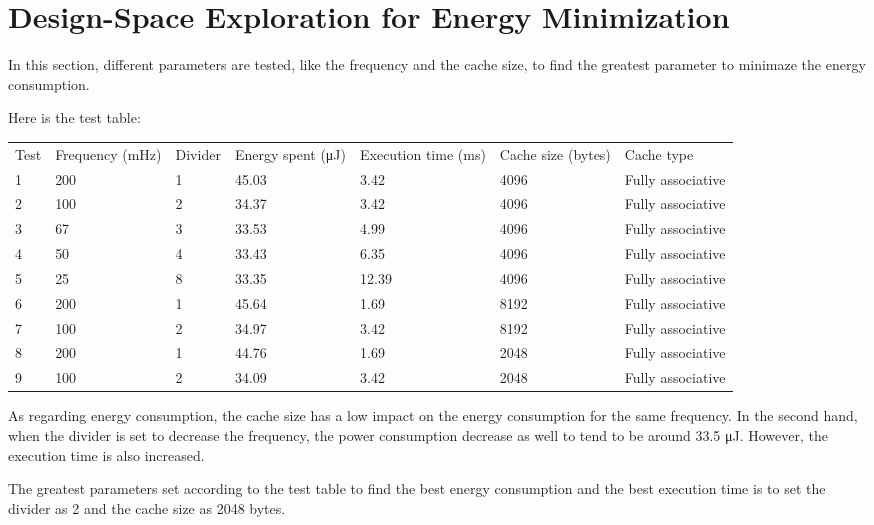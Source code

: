 \section{Design-Space Exploration for Energy Minimization}

In this section, different parameters are tested, like the frequency and the cache size, to find the greatest parameter to minimaze the energy consumption. 

Here is the test table:

\begin{table}[]
\begin{tabular}{lllllll}
Test & Frequency (mHz) & Divider & Energy spent (μJ) & Execution time (ms) & Cache size (bytes) & Cache type        \\
1    & 200             & 1       & 45.03             & 3.42                & 4096               & Fully associative \\
2    & 100             & 2       & 34.37             & 3.42                & 4096               & Fully associative \\
3    & 67              & 3       & 33.53             & 4.99                & 4096               & Fully associative \\
4    & 50              & 4       & 33.43             & 6.35                & 4096               & Fully associative \\
5    & 25              & 8       & 33.35             & 12.39               & 4096               & Fully associative \\
6    & 200             & 1       & 45.64             & 1.69                & 8192               & Fully associative \\
7    & 100             & 2       & 34.97             & 3.42                & 8192               & Fully associative \\
8    & 200             & 1       & 44.76             & 1.69                & 2048               & Fully associative \\
9    & 100             & 2       & 34.09             & 3.42                & 2048               & Fully associative
\end{tabular}
\end{table}

As regarding energy consumption, the cache size has a low impact on the energy consumption for the same frequency.
In the second hand, when the divider is set to decrease the frequency, the power consumption decrease as well to tend to be around 33.5 μJ. However, the execution time is also increased. 

The greatest parameters set according to the test table to find the best energy consumption and the best execution time is to set the divider as 2 and the cache size as 2048 bytes.